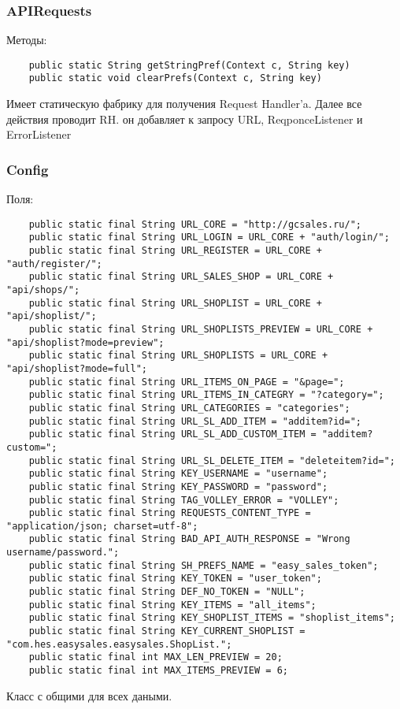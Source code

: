 \subsubsection{APIRequests}
Методы:\\

\begin{small}
    \begin{verbatim}
    public static String getStringPref(Context c, String key)
    public static void clearPrefs(Context c, String key)
    \end{verbatim}
\end{small}
Имеет статическую фабрику для получения Request Handler'a. Далее все действия
проводит RH. он добавляет к запросу URL, ReqponceListener и ErrorListener

\subsubsection{Config}
Поля:\\
\begin{small}
    \begin{verbatim}
    public static final String URL_CORE = "http://gcsales.ru/";
    public static final String URL_LOGIN = URL_CORE + "auth/login/";
    public static final String URL_REGISTER = URL_CORE + "auth/register/";
    public static final String URL_SALES_SHOP = URL_CORE + "api/shops/";
    public static final String URL_SHOPLIST = URL_CORE + "api/shoplist/";
    public static final String URL_SHOPLISTS_PREVIEW = URL_CORE + "api/shoplist?mode=preview";
    public static final String URL_SHOPLISTS = URL_CORE + "api/shoplist?mode=full";
    public static final String URL_ITEMS_ON_PAGE = "&page=";
    public static final String URL_ITEMS_IN_CATEGRY = "?category=";
    public static final String URL_CATEGORIES = "categories";
    public static final String URL_SL_ADD_ITEM = "additem?id=";
    public static final String URL_SL_ADD_CUSTOM_ITEM = "additem?custom=";
    public static final String URL_SL_DELETE_ITEM = "deleteitem?id=";
    public static final String KEY_USERNAME = "username";
    public static final String KEY_PASSWORD = "password";
    public static final String TAG_VOLLEY_ERROR = "VOLLEY";
    public static final String REQUESTS_CONTENT_TYPE = "application/json; charset=utf-8";
    public static final String BAD_API_AUTH_RESPONSE = "Wrong username/password.";
    public static final String SH_PREFS_NAME = "easy_sales_token";
    public static final String KEY_TOKEN = "user_token";
    public static final String DEF_NO_TOKEN = "NULL";
    public static final String KEY_ITEMS = "all_items";
    public static final String KEY_SHOPLIST_ITEMS = "shoplist_items";
    public static final String KEY_CURRENT_SHOPLIST = "com.hes.easysales.easysales.ShopList.";
    public static final int MAX_LEN_PREVIEW = 20;
    public static final int MAX_ITEMS_PREVIEW = 6;
\end{verbatim}
\end{small}
Класс с общими для всех даными.

